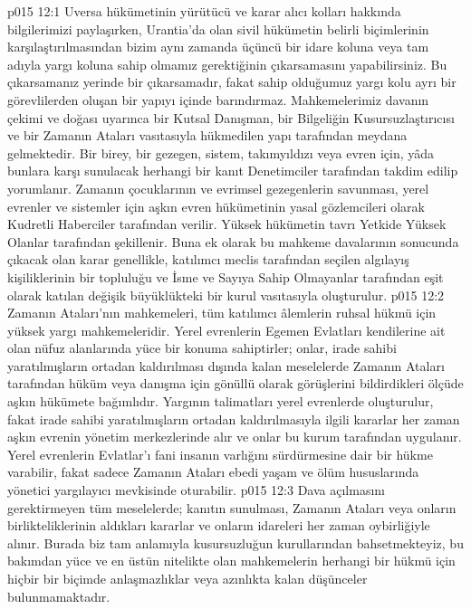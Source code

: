 \vs p015 12:1 Uversa hükümetinin yürütücü ve karar alıcı kolları hakkında bilgilerimizi paylaşırken, Urantia’da olan sivil hükümetin belirli biçimlerinin karşılaştırılmasından bizim aynı zamanda üçüncü bir idare koluna veya tam adıyla yargı koluna sahip olmamız gerektiğinin çıkarsamasını yapabilirsiniz. Bu çıkarsamanız yerinde bir çıkarsamadır, fakat sahip olduğumuz yargı kolu ayrı bir görevlilerden oluşan bir yapıyı içinde barındırmaz. Mahkemelerimiz davanın çekimi ve doğası uyarınca bir Kutsal Danışman, bir Bilgeliğin Kusursuzlaştırıcısı ve bir Zamanın Ataları vasıtasıyla hükmedilen yapı tarafından meydana gelmektedir. Bir birey, bir gezegen, sistem, takımyıldızı veya evren için, yâda bunlara karşı sunulacak herhangi bir kanıt Denetimciler tarafından takdim edilip yorumlanır. Zamanın çocuklarının ve evrimsel gezegenlerin savunması, yerel evrenler ve sistemler için aşkın evren hükümetinin yasal gözlemcileri olarak Kudretli Haberciler tarafından verilir. Yüksek hükümetin tavrı Yetkide Yüksek Olanlar tarafından şekillenir. Buna ek olarak bu mahkeme davalarının sonucunda çıkacak olan karar genellikle, katılımcı meclis tarafından seçilen algılayış kişiliklerinin bir topluluğu ve İsme ve Sayıya Sahip Olmayanlar tarafından eşit olarak katılan değişik büyüklükteki bir kurul vasıtasıyla oluşturulur.
\vs p015 12:2 Zamanın Ataları’nın mahkemeleri, tüm katılımcı âlemlerin ruhsal hükmü için yüksek yargı mahkemeleridir. Yerel evrenlerin Egemen Evlatları kendilerine ait olan nüfuz alanlarında yüce bir konuma sahiptirler; onlar, irade sahibi yaratılmışların ortadan kaldırılması dışında kalan meselelerde Zamanın Ataları tarafından hüküm veya danışma için gönüllü olarak görüşlerini bildirdikleri ölçüde aşkın hükümete bağımlıdır. Yargının talimatları yerel evrenlerde oluşturulur, fakat irade sahibi yaratılmışların ortadan kaldırılmasıyla ilgili kararlar her zaman aşkın evrenin yönetim merkezlerinde alır ve onlar bu kurum tarafından uygulanır. Yerel evrenlerin Evlatlar’ı fani insanın varlığını sürdürmesine dair bir hükme varabilir, fakat sadece Zamanın Ataları ebedi yaşam ve ölüm hususlarında yönetici yargılayıcı mevkisinde oturabilir.
\vs p015 12:3 Dava açılmasını gerektirmeyen tüm meselelerde; kanıtın sunulması, Zamanın Ataları veya onların birlikteliklerinin aldıkları kararlar ve onların idareleri her zaman oybirliğiyle alınır. Burada biz tam anlamıyla kusursuzluğun kurullarından bahsetmekteyiz, bu bakımdan yüce ve en üstün nitelikte olan mahkemelerin herhangi bir hükmü için hiçbir bir biçimde anlaşmazlıklar veya azınlıkta kalan düşünceler bulunmamaktadır.
